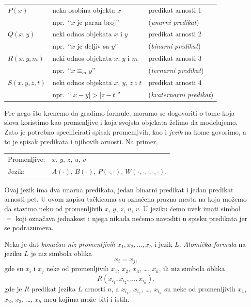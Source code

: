 \begin{center}
\begin{tabular}{lll}
  \hline
  $P(x)$&neka osobina objekta $x$&predikat arnosti 1 \\
        &npr.\ \enquote{$x$ je paran broj} & (\emph{unarni predikat})\\
  \hline
  $Q(x, y)$&neki odnos objekata $x$ i $y$&predikat arnosti 2\\
        &npr.\ \enquote{$x$ je deljiv sa $y$} & (\emph{binarni predikat})\\
  \hline
  $R(x, y, m)$&neki odnos objekata $x$, $y$ i $m$&predikat arnosti 3\\
        &npr.\ \enquote{$x \equiv_m y$} & (\emph{ternarni predikat})\\
  \hline
  $S(x, y, z, t)$&neki odnos objekata $x$, $y$, $z$ i $t$&predikat arnosti 4\\
        &npr.\ \enquote{$|x - y| > |z - t|$} & (\emph{kvaternarni predikat})\\
  \hline
\end{tabular}
\end{center}

\noindent
Pre nego \v sto krenemo da gradimo formule, moramo se dogovoriti o tome koja slova koristimo kao promenljive
i koja svojsta objekata \v zelimo da modelujemo. Zato je potrebno specificirati 
spisak promenljvih, kao i \emph{jezik} na kome govorimo, a to je spisak predikata i njihovih arnosti.
Na primer,

\begin{center}
  \begin{tabular}{ll}
    Promenljive: & $x$, $y$, $z$, $u$, $v$\\
    Jezik:   & $A(\cdot)$, $B(\cdot)$, $P(\cdot, \cdot)$, $W(\cdot, \cdot, \cdot, \cdot, \cdot)$.
  \end{tabular}
\end{center}

\noindent
Ovaj jezik ima dva unarna predikata, jedan binarni predikat i jedan predikat arnosti pet.
U ovom zapisu ta\v ckicama su ozna\v cena prazna mesta na koja mo\v zemo da stavimo neku od promenljivih
$x$, $y$, $z$, $u$, $v$. U jeziku \'cemo uvek imati simbol $=$ koji ozna\v cava jednakost
i njega nikada ne\'cemo navoditi u spisku predikata jer se podrazumeva.

\begin{DEF}
  Neka je dat \emph{kona\v can niz promenljivih} $x_1, x_2, \ldots, x_h$ i jezik $L$.
  \emph{Atomi\v cka formula} na jeziku $L$ je niz simbola oblika
  $$
    x_i = x_j,
  $$
  gde su $x_i$ i $x_j$ neke od promenljivih $x_1$, $x_2$, $x_3$, \ldots, $x_h$,
  ili niz simbola oblika
  $$
    R(x_{i_1}, x_{i_2}, \ldots, x_{i_n}),
  $$
  gde je $R$ predikat jezika $L$ arnosti $n$, a $x_{i_1}$, $x_{i_2}$, \ldots, $x_{i_n}$
  su neke od promenljivih $x_1$, $x_2$, $x_3$, \ldots, $x_h$ me\dj u kojima mo\v ze biti i istih.
\end{DEF}

